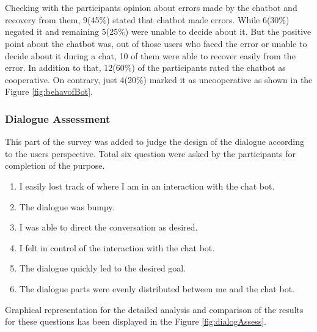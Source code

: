 \\~\\
Checking with the participants opinion about errors made by the chatbot and recovery from them, 9(45\%) stated that chatbot made errors. While 6(30\%) negated it and remaining 5(25\%) were unable to decide about it. But the positive point about the chatbot was, out of those users who faced the error or unable to decide about it during a chat, 10 of them were able to recover easily from the error. In addition to that, 12(60\%) of the participants rated the chatbot as cooperative. On contrary, just 4(20\%) marked it as uncooperative as shown in the Figure \ref{fig:behavofBot}.


\subsubsection*{Dialogue Assessment}
This part of the survey was added to judge the design of the dialogue according to the users perspective. Total six question were asked by the participants for completion of the purpose.
\begin{enumerate}
    \item I easily lost track of where I am in an interaction with the chat bot.
    \item The dialogue was bumpy.
    \item I was able to direct the conversation as desired.
    \item I felt in control of the interaction with the chat bot.
    \item The dialogue quickly led to the desired goal.
    \item The dialogue parts were evenly distributed between me and the chat bot.
\end{enumerate}
Graphical representation for the detailed analysis and comparison of the results for these questions has been displayed in the Figure \ref{fig:dialogAssess}.

